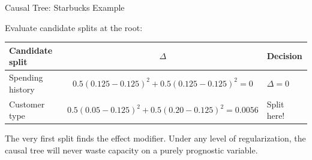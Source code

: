 \documentclass[aspectratio=169, 11pt, handout]{beamer}
\begin{document}
\begin{frame}{Causal Tree: Starbucks Example}
 
Evaluate candidate splits at the root:
 
\bigskip
 
\begin{center}
\begin{tabular}{lcl}
\toprule
\textbf{Candidate split} & $\Delta$ & \textbf{Decision} \\
\midrule
Spending history & $0.5(0.125 - 0.125)^2 + 0.5(0.125 - 0.125)^2 = 0$ & \textcolor{warnred}{$\Delta = 0$} \\
Customer type    & $0.5(0.05 - 0.125)^2 + 0.5(0.20 - 0.125)^2 = 0.0056$ & \textcolor{sbgreen}{Split here!} \\
\bottomrule
\end{tabular}
\end{center}
 
\pause
\bigskip
 
\begin{center}
\end{center}
 
\medskip
 
The very first split finds the effect modifier. Under any level of regularization, the causal tree will never waste capacity on a purely prognostic variable.
 
\end{frame}
 
\end{document}
